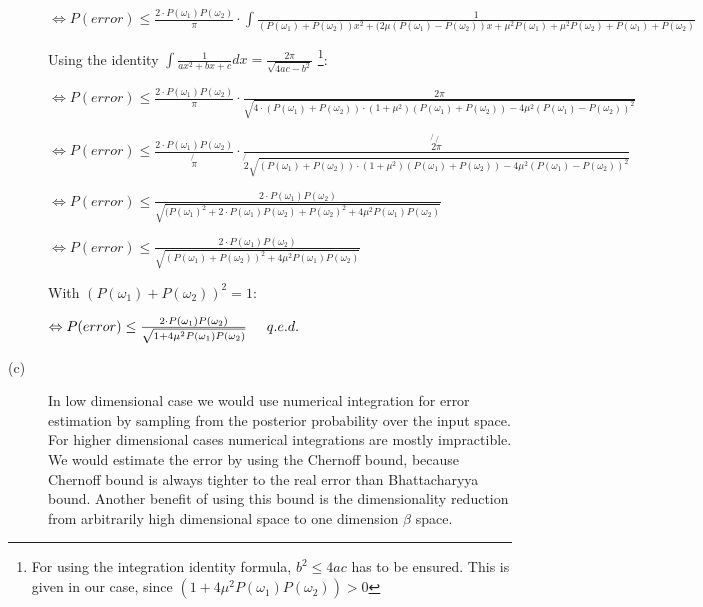 \documentclass{article}
\begin{document}
\begin{description}
$\Leftrightarrow P(error) \leq \frac{2 \cdot P(\omega_1) P(\omega_2)}{\pi} \cdot \int\frac{1}{(P(\omega_1) + P(\omega_2)) x^2 + (2 \mu (P(\omega_1)-P(\omega_2))x + \mu^2 P(\omega_1) + \mu^2 P(\omega_2) + P(\omega_1) + P(\omega_2)}$ 

\vspace{0.3cm}
Using the identity $\int \frac{1}{ax^2 + bx + c} dx = \frac{2 \pi}{\sqrt{4ac-b^2}}$ \footnote[1]{For using the integration identity formula, $b^2 \leq 4ac$ has to be ensured. This is given in our case, since $(1+ 4 \mu^2 P(\omega_1) P(\omega_2)) > 0$}:
\vspace{0.3cm}

$\Leftrightarrow P(error) \leq \frac{2 \cdot P(\omega_1) P(\omega_2)}{\pi} \cdot \frac{2 \pi}{\sqrt{4 \cdot (P(\omega_1) + P(\omega_2)) \cdot (1 + \mu^2) (P(\omega_1)+P(\omega_2)) - 4 \mu^2 (P(\omega_1) - P(\omega_2))^2 }}$ 

$\Leftrightarrow P(error) \leq \frac{2 \cdot P(\omega_1) P(\omega_2)}{\not{\pi}} \cdot \frac{\not{2} \not{\pi}}{\not{2} \sqrt{(P(\omega_1) + P(\omega_2)) \cdot (1 + \mu^2) (P(\omega_1)+P(\omega_2)) - 4 \mu^2 (P(\omega_1) - P(\omega_2))^2 }}$ 

$\Leftrightarrow P(error) \leq \frac{2 \cdot P(\omega_1) P(\omega_2)}{\sqrt{(P(\omega_1)^2 + 2 \cdot P(\omega_1) P(\omega_2) + P(\omega_2)^2 + 4 \mu^2 P(\omega_1) P(\omega_2) }}$ 

$\Leftrightarrow P(error) \leq \frac{2 \cdot P(\omega_1) P(\omega_2)}{\sqrt{(P(\omega_1) + P(\omega_2))^2 + 4 \mu^2 P(\omega_1) P(\omega_2) }}$ 

\vspace{0.3cm}
With $(P(\omega_1) + P(\omega_2))^2 = 1$:
\vspace{0.3cm}

$\Leftrightarrow P(error) \leq \frac{2 \cdot P(\omega_1) P(\omega_2)}{\sqrt{1 + 4 \mu^2 P(\omega_1) P(\omega_2)}} \hspace{0.5cm} q.e.d.$ 



\item[(c)]

In low dimensional case we would use numerical integration for error estimation by sampling from the posterior probability over the input space. \\
For higher dimensional cases numerical integrations are mostly impractible. We would estimate the error by using the Chernoff bound, because Chernoff bound is always tighter to the real error than Bhattacharyya bound. Another benefit of using this bound is the dimensionality reduction from arbitrarily high dimensional space to one dimension $\beta$ space.


\end{description}
\end{document}
